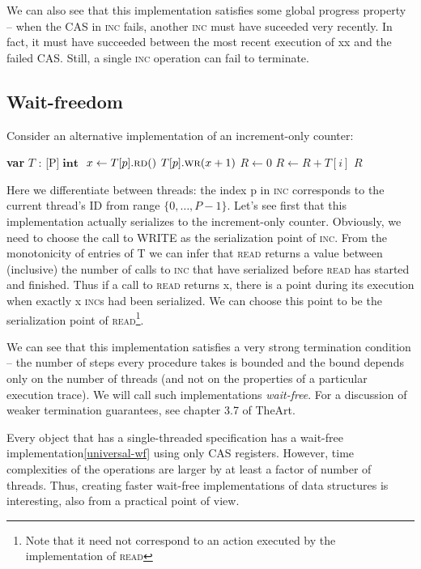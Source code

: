 \documentclass[a4paper,11pt]{article}
\def\int{\ensuremath{\operatorname{\textbf{int}}}}
\newcommand{\fn}[1]{\textsc{#1}}
\newcommand{\var}[2]{\textbf{var }#1 : #2}
\newcommand{\arrayspec}[1]{\text{array}[#1]\text{ of }}
\begin{document}
We can also see that this implementation satisfies some global progress property -- when the CAS in \fn{inc} fails,
another \fn{inc} must have suceeded very recently. In fact, it must have succeeded between the most recent execution
of xx and the failed CAS. Still, a single \fn{inc} operation can fail to terminate.

\subsection{Wait-freedom}

Consider an alternative implementation of an increment-only counter:

\begin{algorithmic}[1]
	\State\var{$T$}{\arrayspec{P}$\int$} \Comment{T is an array of $P$ CAS objects of type \int}
	\State $x \gets T[p].\fn{rd}()$
	\State $T[p].\fn{wr}(x + 1)$
\EndFunction
{}
	\State $R \gets 0$
		\State $R \gets R + T[i]$
	\EndFor
	\State\Return $R$
\EndFunction
\end{algorithmic}

Here we differentiate between threads: the index p in \fn{inc} corresponds to the current thread's ID from range
$\{0, \ldots, P-1\}$. Let's see first that this implementation actually serializes to the increment-only counter.
Obviously, we need to choose the call to WRITE as the serialization point of \fn{inc}. From the monotonicity
of entries of T we can infer that \fn{read} returns a value between (inclusive) the number of calls to \fn{inc} that have
serialized before \fn{read} has started and finished. Thus if a call to \fn{read} returns x, there is a point during its
execution when exactly x \fn{inc}s had been serialized. We can choose this point to be the serialization point of
\fn{read}\footnote{Note that it need not correspond to an action executed by the implementation of \fn{read}}.

We can see that this implementation satisfies a very strong termination condition -- the number of steps every
procedure takes is bounded and the bound depends only on the number of threads (and not on the properties of
a particular execution trace). We will call such implementations \emph{wait-free}. For a discussion of weaker
termination guarantees, see chapter 3.7 of TheArt.

Every object that has a single-threaded specification has a wait-free implementation\ref{universal-wf} using
only CAS registers.
However, time complexities of the operations are larger by at least a factor of number of threads. 
Thus, creating faster wait-free implementations of data structures is interesting, also from a practical
point of view.
\end{document}
